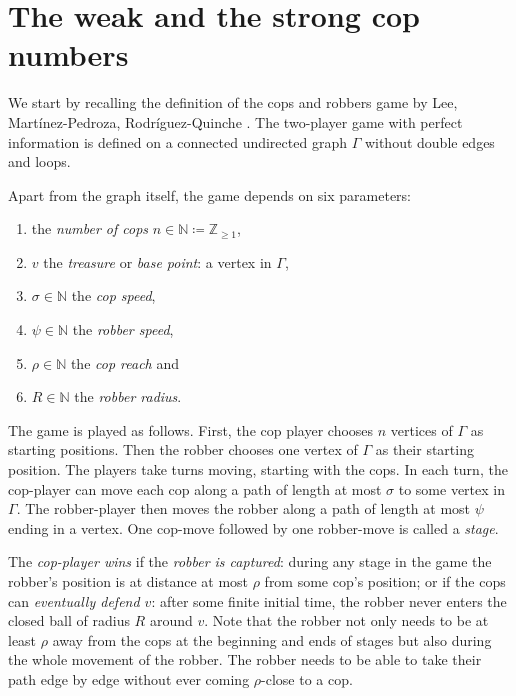 \documentclass{amsart}
\theoremstyle{definition}
\theoremstyle{remark}
\theoremstyle{remark}
\theoremstyle{definition}
\newcommand{\Z}{\mathbb{Z}} %
\newcommand{\N}{\mathbb{N}}
\renewcommand{\geq}{\geqslant}
\begin{document}
\section{The weak and the strong cop numbers}\label{sec:def}

We start by recalling the definition of the cops and robbers game by Lee, Martínez-Pedroza, Rodríguez-Quinche \cite{LMR23}.
The two-player game with perfect information is defined on a connected undirected graph $\Gamma$ without double edges and loops.

Apart from the graph itself, the game depends on six parameters:
\begin{enumerate}
	\item the \emph{number of cops} \(n\in \N \coloneq \Z_{\geq 1}\),
	\item \(v\) the \emph{treasure} or \emph{base point}: a vertex in \(\Gamma\),
	\item \(\sigma \in \N\) the \emph{cop speed},
	\item \(\psi \in \N\) the \emph{robber speed},
	\item \(\rho \in \N\) the \emph{cop reach} and
	\item \(R \in \N\) the \emph{robber radius}.
\end{enumerate}
The game is played as follows. First, the cop player chooses $n$ vertices of $\Gamma$ as starting positions.
Then the robber chooses one vertex of $\Gamma$ as their starting position. The players take turns moving, starting with the cops.
In each turn, the cop-player can move each cop along a path of length at most $\sigma$ to some vertex in $\Gamma$.
The robber-player then moves the robber along a path of length at most $\psi$ ending in a vertex. One cop-move followed by one robber-move is called a \emph{stage}.

The \emph{cop-player wins} if the \emph{robber is captured}: during any stage in the game the robber's position is at distance at most $\rho$ from some cop's position; or if the cops can \emph{eventually defend $v$}: after some finite initial time, the robber never enters the closed ball of radius $R$ around $v$.
Note that the robber not only needs to be at least $\rho$ away from the cops at the beginning and ends of stages but also during the whole movement of the robber. The robber needs to be able to take their path edge by edge without ever coming $\rho$-close to a cop.
\end{document}
